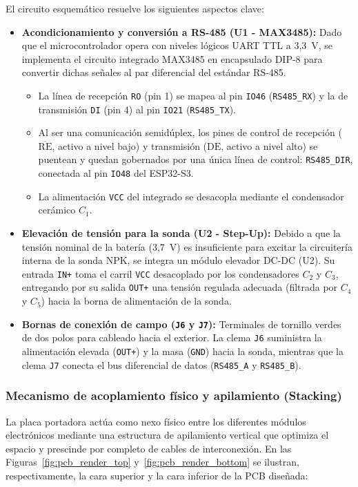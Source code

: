 El circuito esquemático resuelve los siguientes aspectos clave:
\begin{itemize}
    \item \textbf{Acondicionamiento y conversión a RS-485 (U1 - MAX3485):} Dado que el microcontrolador opera con niveles lógicos UART TTL a 3,3~V, se implementa el circuito integrado MAX3485 en encapsulado DIP-8 para convertir dichas señales al par diferencial del estándar RS-485. 
    \begin{itemize}
        \item La línea de recepción \texttt{RO} (pin 1) se mapea al pin \texttt{IO46} (\texttt{RS485\_RX}) y la de transmisión \texttt{DI} (pin 4) al pin \texttt{IO21} (\texttt{RS485\_TX}).
        \item Al ser una comunicación semidúplex, los pines de control de recepción ($\overline{\text{RE}}$, activo a nivel bajo) y transmisión ($\text{DE}$, activo a nivel alto) se puentean y quedan gobernados por una única línea de control: \texttt{RS485\_DIR}, conectada al pin \texttt{IO48} del ESP32-S3.
        \item La alimentación \texttt{VCC} del integrado se desacopla mediante el condensador cerámico $C_1$.
    \end{itemize}
    \item \textbf{Elevación de tensión para la sonda (U2 - Step-Up):} Debido a que la tensión nominal de la batería (3,7~V) es insuficiente para excitar la circuitería interna de la sonda NPK, se integra un módulo elevador DC-DC (U2). Su entrada \texttt{IN+} toma el carril \texttt{VCC} desacoplado por los condensadores $C_2$ y $C_3$, entregando por su salida \texttt{OUT+} una tensión regulada adecuada (filtrada por $C_4$ y $C_5$) hacia la borna de alimentación de la sonda.
    \item \textbf{Bornas de conexión de campo (\texttt{J6} y \texttt{J7}):} Terminales de tornillo verdes de dos polos para cableado hacia el exterior. La clema \texttt{J6} suministra la alimentación elevada (\texttt{OUT+}) y la masa (\texttt{GND}) hacia la sonda, mientras que la clema \texttt{J7} conecta el bus diferencial de datos (\texttt{RS485\_A} y \texttt{RS485\_B}).
\end{itemize}

\subsubsection{Mecanismo de acoplamiento físico y apilamiento (Stacking)}
La placa portadora actúa como nexo físico entre los diferentes módulos electrónicos mediante una estructura de apilamiento vertical que optimiza el espacio y prescinde por completo de cables de interconexión. En las Figuras~\ref{fig:pcb_render_top} y~\ref{fig:pcb_render_bottom} se ilustran, respectivamente, la cara superior y la cara inferior de la PCB diseñada:

